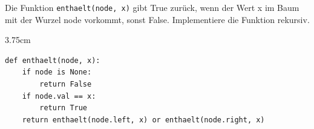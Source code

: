 \question[3]
Die Funktion \texttt{enthaelt(node, x)} gibt True zurück, wenn der Wert x im Baum mit der Wurzel node vorkommt, sonst False.
Implementiere die Funktion rekursiv.
\begin{solutionbox}{3.75cm}
\begin{lstlisting}
def enthaelt(node, x):
    if node is None:
        return False
    if node.val == x:
        return True
    return enthaelt(node.left, x) or enthaelt(node.right, x)
\end{lstlisting}
\end{solutionbox}
